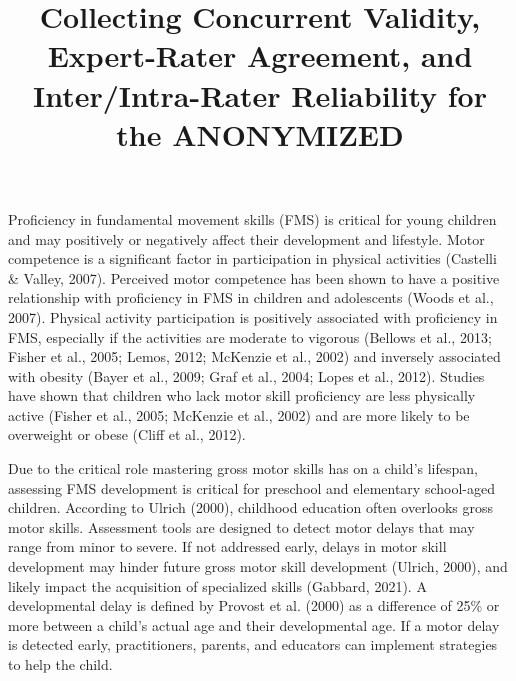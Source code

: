 \documentclass[
  man,
  colorlinks=true,linkcolor=blue,citecolor=blue,urlcolor=blue]{apa7}
\title{Collecting Concurrent Validity, Expert-Rater Agreement, and
Inter/Intra-Rater Reliability for the ANONYMIZED}
\date{}
\begin{document}
\maketitle
\ifdefined\Shaded\renewenvironment{Shaded}{\begin{tcolorbox}[enhanced, sharp corners, frame hidden, interior hidden, borderline west={3pt}{0pt}{shadecolor}, boxrule=0pt, breakable]}{\end{tcolorbox}}\fi
Proficiency in fundamental movement skills (FMS) is critical for young
children and may positively or negatively affect their development and
lifestyle. Motor competence is a significant factor in participation in
physical activities (Castelli \& Valley, 2007). Perceived motor
competence has been shown to have a positive relationship with
proficiency in FMS in children and adolescents (Woods et al., 2007).
Physical activity participation is positively associated with
proficiency in FMS, especially if the activities are moderate to
vigorous (Bellows et al., 2013; Fisher et al., 2005; Lemos, 2012;
McKenzie et al., 2002) and inversely associated with obesity (Bayer et
al., 2009; Graf et al., 2004; Lopes et al., 2012). Studies have shown
that children who lack motor skill proficiency are less physically
active (Fisher et al., 2005; McKenzie et al., 2002) and are more likely
to be overweight or obese (Cliff et al., 2012).

Due to the critical role mastering gross motor skills has on a child's
lifespan, assessing FMS development is critical for preschool and
elementary school-aged children. According to Ulrich (2000), childhood
education often overlooks gross motor skills. Assessment tools are
designed to detect motor delays that may range from minor to severe. If
not addressed early, delays in motor skill development may hinder future
gross motor skill development (Ulrich, 2000), and likely impact the
acquisition of specialized skills (Gabbard, 2021). A developmental delay
is defined by Provost et al. (2000) as a difference of 25\% or more
between a child's actual age and their developmental age. If a motor
delay is detected early, practitioners, parents, and educators can
implement strategies to help the child.
\end{document}

